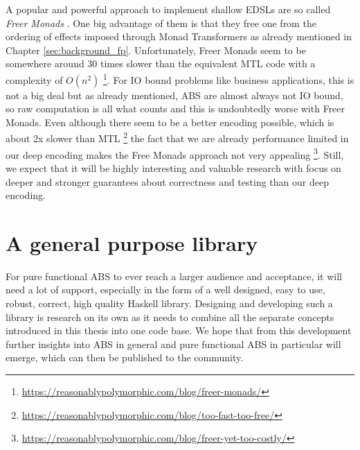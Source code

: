 A popular and powerful approach to implement shallow EDSLs are so called \textit{Freer Monads} \cite{rivas_notions_2014}. One big advantage of them is that they free one from the ordering of effects imposed through Monad Transformers as already mentioned in Chapter \ref{sec:background_fp}. Unfortunately, Freer Monads seem to be somewhere around 30 times slower than the equivalent MTL code with a complexity of $O(n^2)$ \footnote{\url{https://reasonablypolymorphic.com/blog/freer-monads/}}. For IO bound problems like business applications, this is not a big deal but as already mentioned, ABS are almost always not IO bound, so raw computation is all what counts and this is undoubtedly worse with Freer Monads. Even although there seem to be a better encoding possible, which is about 2x slower than MTL \footnote{\url{https://reasonablypolymorphic.com/blog/too-fast-too-free/}} the fact that we are already performance limited in our deep encoding makes the Free Monads approach not very appealing \footnote{\url{https://reasonablypolymorphic.com/blog/freer-yet-too-costly/}}. Still, we expect that it will be highly interesting and valuable research with focus on deeper and stronger guarantees about correctness and testing than our deep encoding.


\section{A general purpose library}
For pure functional ABS to ever reach a larger audience and acceptance, it will need a lot of support, especially in the form of a well designed, easy to use, robust, correct, high quality Haskell library. Designing and developing such a library is research on its own as it needs to combine all the separate concepts introduced in this thesis into one code base. We hope that from this development further insights into ABS in general and pure functional ABS in particular will emerge, which can then be published to the community.


